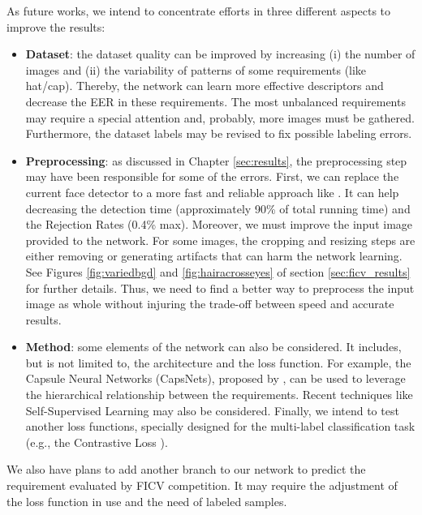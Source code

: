 As future works, we intend to concentrate efforts in three different aspects to improve the results:

\begin{itemize}
\item \textbf{Dataset}: the dataset quality can be improved by increasing (i) the number of images and (ii) the variability of patterns of some requirements (like hat/cap). Thereby, the network can learn more effective descriptors and decrease the EER in these requirements. The most unbalanced requirements may require a special attention and, probably, more images must be gathered. Furthermore, the dataset labels may be revised to fix possible labeling errors.

\item \textbf{Preprocessing}: as discussed in Chapter \ref{sec:results}, the preprocessing step may have been responsible for some of the errors. First, we can replace the current face detector to a more fast and reliable approach like \cite{faceboxes}. It can help decreasing the detection time (approximately 90\% of total running time) and the Rejection Rates (0.4\% max). Moreover, we must improve the input image provided to the network. For some images, the cropping and resizing steps are either removing or generating artifacts that can harm the network learning. See Figures \ref{fig:variedbgd} and \ref{fig:hairacrosseyes} of section \ref{sec:ficv_results} for further details. Thus, we need to find a better way to preprocess the input image as whole without injuring the trade-off between speed and accurate results.

\item \textbf{Method}: some elements of the network can also be considered. It includes, but is not limited to, the architecture and the loss function. For example, the Capsule Neural Networks (CapsNets), proposed by \cite{sabour2017dynamic}, can be used to leverage the hierarchical relationship between the requirements. Recent techniques like Self-Supervised Learning \citep{doersch2017multi} may also be considered. Finally, we intend to test another loss functions, specially designed for the multi-label classification task (e.g., the Contrastive Loss \citep{khosla2020supervised}).
\end{itemize}

We also have plans to add another branch to our network to predict the \citeReq{\eyecenterlocation} requirement evaluated by FICV competition. It may require the adjustment of the loss function in use and the need of labeled samples.

